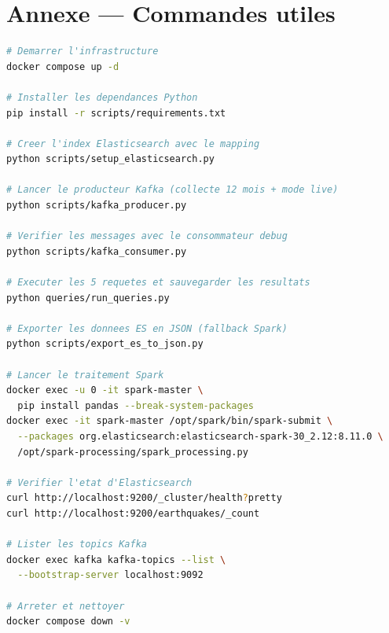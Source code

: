 \documentclass[12pt,a4paper]{article}
\begin{document}
\appendix
\section{Annexe — Commandes utiles}

\begin{lstlisting}[language=bash, caption={Commandes de gestion du pipeline}]
# Demarrer l'infrastructure
docker compose up -d

# Installer les dependances Python
pip install -r scripts/requirements.txt

# Creer l'index Elasticsearch avec le mapping
python scripts/setup_elasticsearch.py

# Lancer le producteur Kafka (collecte 12 mois + mode live)
python scripts/kafka_producer.py

# Verifier les messages avec le consommateur debug
python scripts/kafka_consumer.py

# Executer les 5 requetes et sauvegarder les resultats
python queries/run_queries.py

# Exporter les donnees ES en JSON (fallback Spark)
python scripts/export_es_to_json.py

# Lancer le traitement Spark
docker exec -u 0 -it spark-master \
  pip install pandas --break-system-packages
docker exec -it spark-master /opt/spark/bin/spark-submit \
  --packages org.elasticsearch:elasticsearch-spark-30_2.12:8.11.0 \
  /opt/spark-processing/spark_processing.py

# Verifier l'etat d'Elasticsearch
curl http://localhost:9200/_cluster/health?pretty
curl http://localhost:9200/earthquakes/_count

# Lister les topics Kafka
docker exec kafka kafka-topics --list \
  --bootstrap-server localhost:9092

# Arreter et nettoyer
docker compose down -v
\end{lstlisting}
\end{document}
